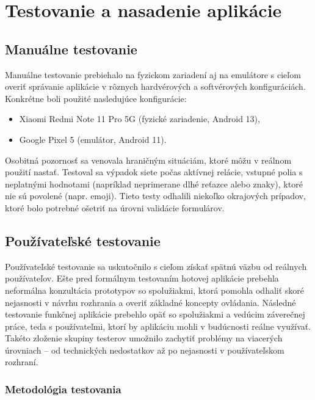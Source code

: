 \chapter{Testovanie a nasadenie aplikácie}
\label{chap:testovanie}

\section{Manuálne testovanie}

Manuálne testovanie prebiehalo na fyzickom zariadení aj na emulátore s cieľom overiť správanie aplikácie v rôznych hardvérových a softvérových konfiguráciách. Konkrétne boli použité nasledujúce konfigurácie:
\begin{itemize}
    \item Xiaomi Redmi Note 11 Pro 5G (fyzické zariadenie, Android 13),
    \item Google Pixel 5 (emulátor, Android 11).
\end{itemize}

Osobitná pozornosť sa venovala hraničným situáciám, ktoré môžu 
v reálnom použití nastať. Testoval sa výpadok siete počas aktívnej relácie, vstupné polia s neplatnými hodnotami (napríklad neprimerane dlhé reťazce alebo znaky), ktoré nie sú povolené 
(napr. emoji). Tieto testy odhalili niekoľko okrajových prípadov, 
ktoré bolo potrebné ošetriť na úrovni validácie formulárov.

\section{Používateľské testovanie}

Používateľské testovanie sa uskutočnilo s cieľom získať spätnú väzbu 
od reálnych používateľov. Ešte pred formálnym testovaním hotovej 
aplikácie prebehla neformálna konzultácia prototypov so spolužiakmi, 
ktorá pomohla odhaliť skoré nejasnosti v návrhu rozhrania a overiť 
základné koncepty ovládania. Následné testovanie funkčnej aplikácie 
prebehlo opäť so spolužiakmi a vedúcim záverečnej práce, teda 
s používateľmi, ktorí by aplikáciu mohli v budúcnosti reálne 
využívať. Takéto zloženie skupiny testerov umožnilo zachytiť 
problémy na viacerých úrovniach – od technických nedostatkov 
až po nejasnosti v používateľskom rozhraní.

\subsection{Metodológia testovania}

